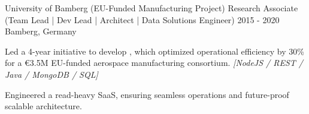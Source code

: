 \begin{cventries}
    
\vspace{4ex}




    
        
  \cventry
    {University of Bamberg (EU-Funded Manufacturing Project)} %
    {Research Associate (Team Lead | Dev Lead | Architect | Data Solutions Engineer)} %
    {2015 - 2020} %
    {Bamberg, Germany} %
    {
      \begin{cvitems} %
		\item {Led a 4-year initiative to develop , which optimized operational efficiency by 30\% for a €3.5M EU-funded aerospace manufacturing consortium. \textit{[NodeJS / REST / Java / MongoDB / SQL]}}
		\item {Engineered a read-heavy SaaS, ensuring seamless operations and future-proof scalable architecture.}
      \end{cvitems}
    }
    
    
\vspace{4ex}







\end{cventries}
